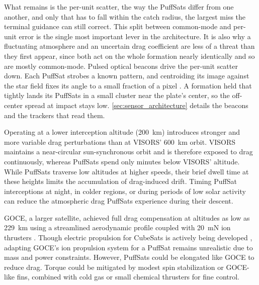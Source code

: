 \documentclass{article}
\begin{document}
What remains is the per-unit scatter, the way the PuffSats differ from one another, and only that has to fall within the catch radius, the largest miss the terminal guidance can still correct. This split between common-mode and per-unit error is the single most important lever in the architecture. It is also why a fluctuating atmosphere and an uncertain drag coefficient are less of a threat than they first appear, since both act on the whole formation nearly identically and so are mostly common-mode. Pulsed optical beacons drive the per-unit scatter down. Each PuffSat strobes a known pattern, and centroiding its image against the star field fixes its angle to a small fraction of a pixel \cite{liebe2002startracker}. A formation held that tightly lands its PuffSats in a small cluster near the plate's center, so the off-center spread at impact stays low. \autoref{sec:sensor_architecture} details the beacons and the trackers that read them.

Operating at a lower interception altitude (\SI{200}{\kilo\meter}) introduces stronger and more variable drag perturbations than at VISORS' \SI{600}{\kilo\meter} orbit. VISORS maintains a near-circular sun-synchronous orbit and is therefore exposed to drag continuously, whereas PuffSats spend only minutes below VISORS' altitude. While PuffSats traverse low altitudes at higher speeds, their brief dwell time at these heights limits the accumulation of drag-induced drift. Timing PuffSat interceptions at night, in colder regions, or during periods of low solar activity can reduce the atmospheric drag PuffSats experience during their descent.

GOCE, a larger satellite, achieved full drag compensation at altitudes as low as \SI{229}{\kilo\meter} using a streamlined aerodynamic profile coupled with \SI{20}{\milli\newton} ion thrusters \cite{goce_dragfree, goce_229km}. Though electric propulsion for CubeSats is actively being developed \cite{busek_iodine}, adapting GOCE's ion propulsion system for a PuffSat remains unrealistic due to mass and power constraints. However, PuffSats could be elongated like GOCE to reduce drag. Torque could be mitigated by modest spin stabilization or GOCE-like fins, combined with cold gas or small chemical thrusters for fine control.
\end{document}
